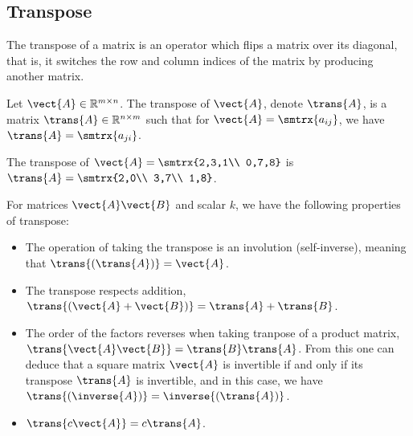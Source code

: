 \subsection{Transpose}
The transpose of a matrix is an operator which flips a matrix over its diagonal, that is, it switches the row and column indices of the matrix by producing another matrix.\par 
Let $\vect{A}\in \mathbb{R}^{m\times n}$. The transpose of $\vect{A}$, denote $\trans{A}$, is a matrix $\trans{A}\in \mathbb{R}^{n\times m}$ such that for $\vect{A}=\smtrx{a_{ij}}$, we have $\trans{A}=\smtrx{a_{ji}}$.\par 
\begin{example}
    The transpose of $\vect{A}=\smtrx{2,3,1\\ 0,7,8}$ is $\trans{A}=\smtrx{2,0\\ 3,7\\ 1,8}$.
\end{example}
For matrices $\vect{A}\vect{B}$ and scalar $k$, we have the following properties of transpose:
\begin{itemize}
\item The operation of taking the transpose is an involution (self-inverse), meaning that $\trans{\left( \trans{A} \right)}=\vect{A}$.
\item The transpose respects addition, $\trans{\left( \vect{A}+\vect{B} \right)}=\trans{A}+\trans{B}$.
\item The order of the factors reverses when taking tranpose of a product matrix, $\trans{\vect{A}\vect{B}}=\trans{B}\trans{A}$. From this one can deduce that a square matrix $\vect{A}$ is invertible if and only if its transpose $\trans{A}$ is invertible, and in this case, we have $\trans{\left( \inverse{A} \right)}=\inverse{\left( \trans{A} \right)}$.
\item $\trans{c\vect{A}}=c\trans{A}$.
\end{itemize}

